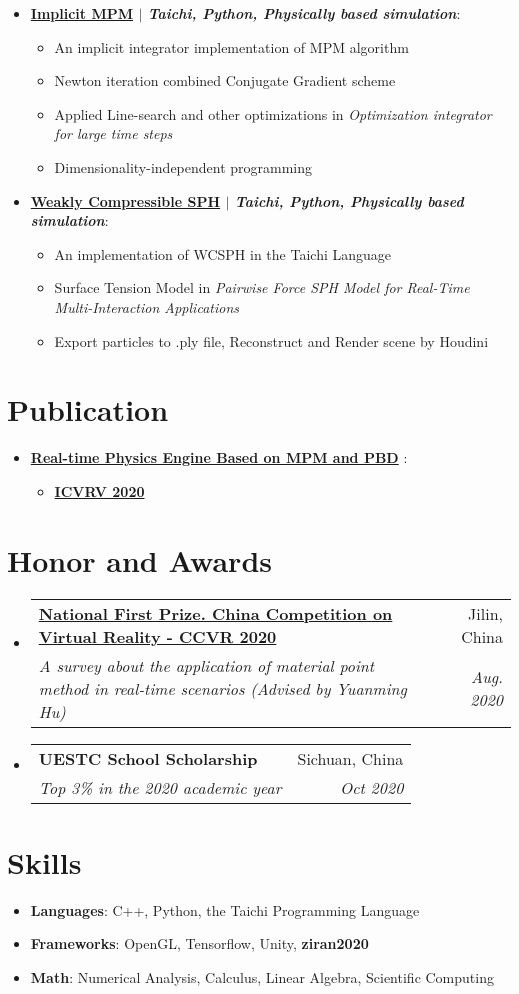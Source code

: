 \documentclass[letterpaper,11pt]{article}
\makeatletter
\newcommand{\resumeItem}[2]{
  \item\small{
    \textbf{#1}{: #2 \vspace{-2pt}}
  }
}
\newcommand{\resumeIteml}[1]{
  \item\small{
    {#1 \vspace{-2pt}}
  }
}
\newcommand{\resumeSubheading}[4]{
  \vspace{-1pt}\item
    \begin{tabular*}{0.97\textwidth}[t]{l@{\extracolsep{\fill}}r}
      \textbf{#1} & #2 \\
      \textit{\small#3} & \textit{\small #4} \\
    \end{tabular*}\vspace{-5pt}
}
\newcommand{\resumeSubItem}[2]{\resumeItem{#1}{#2}\vspace{-4pt}}
\newcommand{\resumeSubHeadingListStart}{\begin{itemize}[leftmargin=*]}
\newcommand{\resumeSubHeadingListEnd}{\end{itemize}}
\newcommand{\resumeItemListStart}{\begin{itemize}}
\newcommand{\resumeItemListEnd}{\end{itemize}\vspace{-5pt}}
\makeatother
\begin{document}
   \resumeSubHeadingListStart
   \resumeSubItem {\href{https://github.com/g1n0st/GAMES201/tree/master/extra/implicitMPM}{\textbf{Implicit MPM}} $|$ \emph{Taichi, Python, Physically based simulation}}{}
	 \resumeItemListStart
        \resumeIteml{ An implicit integrator implementation of MPM algorithm }
        \resumeIteml{ Newton iteration combined Conjugate Gradient scheme }
		\resumeIteml{ Applied Line-search and other optimizations in \textit{Optimization integrator for large time steps} }
		\resumeIteml{ Dimensionality-independent programming }
	 \resumeItemListEnd
  \resumeSubHeadingListEnd

  \resumeSubHeadingListStart
   \resumeSubItem {\href{https://github.com/g1n0st/GAMES201/tree/master/extra/WeaklyCompressibleSPH}{\textbf{Weakly Compressible SPH}} $|$ \emph{Taichi, Python, Physically based simulation}}{}
	 \resumeItemListStart
        \resumeIteml{ An implementation of WCSPH in the Taichi Language }
        \resumeIteml{ Surface Tension Model in \textit{Pairwise Force SPH Model for Real-Time Multi-Interaction Applications} }
		\resumeIteml{ Export particles to .ply file, Reconstruct and Render scene by Houdini }
	 \resumeItemListEnd
  \resumeSubHeadingListEnd

\section{Publication}
    \resumeSubHeadingListStart
      \resumeSubItem
          {\href{}{\textbf{Real-time Physics Engine Based on MPM and PBD}} }{}
          \resumeItemListStart
            \resumeIteml{\href{http://www.icvrv.org/index.html}{\textbf{ICVRV 2020}}}
        \resumeItemListEnd
    \resumeSubHeadingListEnd

\section{Honor and Awards}
  \resumeSubHeadingListStart
    \resumeSubheading
      {\href{https://www.chinavr.info/news/show/id/3659.html}{National First Prize. China Competition on Virtual Reality -  CCVR 2020}}{Jilin, China }
      {A survey about the application of material point method in real-time scenarios (Advised by Yuanming Hu)}{Aug. 2020}
     \resumeSubheading
      {UESTC School Scholarship}{Sichuan, China }
      {Top 3\% in the 2020 academic year } {Oct 2020}
 \resumeSubHeadingListEnd


\section{Skills}
  \resumeSubHeadingListStart
      \resumeSubItem{Languages}{ C++, Python, the Taichi Programming Language }
	  \resumeSubItem{Frameworks}{ OpenGL, Tensorflow, Unity, \textbf{ziran2020} }
      \resumeSubItem{Math}{ Numerical Analysis, Calculus, Linear Algebra, Scientific Computing }
  \resumeSubHeadingListEnd


\end{document}
